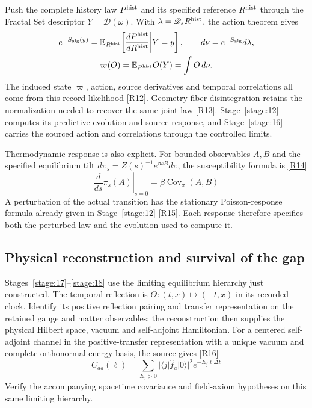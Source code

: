 \documentclass[11pt,a4paper]{article}
\begin{document}
Push the complete history law \(P^{\rm hist}\) and its specified reference \(R^{\rm hist}\) through the Fractal Set descriptor \(Y=\mathscr D(\omega)\). With \(\lambda=\mathscr D_*R^{\rm hist}\), the action theorem gives
\begin{gather*}
e^{-S_{\rm alg}(y)}=
\mathbb E_{R^{\rm hist}}\!\left[
\frac{dP^{\rm hist}}{dR^{\rm hist}}\middle|Y=y\right],
\qquad d\nu=e^{-S_{\rm alg}}d\lambda,\\
\varpi(O)=\mathbb E_{P^{\rm hist}}O(Y)=\int O\,d\nu.
\end{gather*}
The induced state \(\varpi\), action, source derivatives and temporal correlations all come from this record likelihood \hyperref[src:thm-ym-recorded-action-emergence]{[R12]}. Geometry-fiber disintegration retains the normalization needed to recover the same joint law \hyperref[src:thm-ym-native-geometry-fiber-action]{[R13]}. Stage~\ref{stage:12} computes its predictive evolution and source response, and Stage~\ref{stage:16} carries the sourced action and correlations through the controlled limits.

Thermodynamic response is also explicit. For bounded observables \(A,B\) and the specified equilibrium tilt \(d\pi_s=Z(s)^{-1}e^{\beta sB}d\pi\), the susceptibility formula is \hyperref[src:prop-fluctuation-dissipation]{[R14]}
\[
\left.\frac{d}{ds}\pi_s(A)\right|_{s=0}
=\beta\operatorname{Cov}_{\pi}(A,B)
\]
A perturbation of the actual transition has the stationary Poisson-response formula already given in Stage~\ref{stage:12} \hyperref[src:thm-algorithmic-stationary-response]{[R15]}. Each response therefore specifies both the perturbed law and the evolution used to compute it.

\subsection*{Physical reconstruction and survival of the gap}
Stages~\ref{stage:17}--\ref{stage:18} use the limiting equilibrium hierarchy just constructed. The temporal reflection is \(\Theta:(t,x)\mapsto(-t,x)\) in its recorded clock. Identify its positive reflection pairing and transfer representation on the retained gauge and matter observables; the reconstruction then supplies the physical Hilbert space, vacuum and self-adjoint Hamiltonian. For a centered self-adjoint channel in the positive-transfer representation with a unique vacuum and complete orthonormal energy basis, the source gives \hyperref[src:cor-effective-twistor-positive-transfer]{[R16]}
\[
C_{aa}(\ell)=\sum_{E_j>0}
|\langle j|\widehat f_a|0\rangle|^2
e^{-E_j\ell\Delta t}
\]
Verify the accompanying spacetime covariance and field-axiom hypotheses on this same limiting hierarchy.
\end{document}
